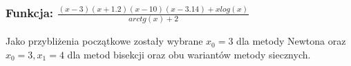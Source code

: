 \documentclass[11pt,wide]{article}
\begin{document}
\subsubsection{Funkcja: $\frac{(x-3)(x+1.2)(x-10)(x-3.14) + xlog(x)}{arctg(x) + 2}$}

\begin{center}
\end{center}
\noindent

Jako przybliżenia początkowe zostały wybrane $x_0 = 3$ dla metody Newtona oraz $x_0 = 3 , x_1 = 4$ dla metod bisekcji oraz obu wariantów metody siecznych.
\end{document}
